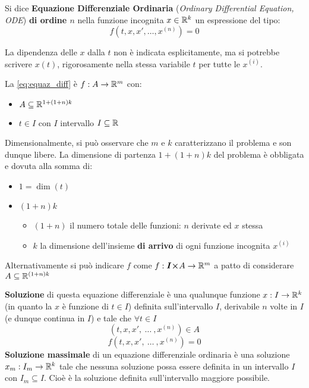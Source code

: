 \begin{definition}
	\label{def:equaz_diff}
	Si dice \textbf{Equazione Differenziale Ordinaria} (\textit{Ordinary Differential Equation, ODE}) \textbf{di ordine $n$} nella funzione incognita $x\in \mathbb{R}^k$ un espressione del tipo:
	\begin{equation}
		\label{eq:equaz_diff}
		f(t,x, x',\ldots,x^{(n)})=0
	\end{equation}
	\vspace*{-\baselineskip}
	\begin{note}
		La dipendenza delle $x$ dalla $t$ non è indicata esplicitamente, ma si potrebbe scrivere $x(t)$, rigorosamente nella stessa variabile $t$ per tutte le $x^{(i)}$.
	\end{note}
	La \cref{eq:equaz_diff} è $f: A \to \mathbb{R}^m$ con:
	\begin{itemize}[noitemsep]
		\item $A\subseteq \mathbb{R}^{1+(1+n)k}$
		\item $t\in I$ con $I$ intervallo $I \subseteq \mathbb{R}$
	\end{itemize}
	Dimensionalmente, si può osservare che $m$ e $k$ caratterizzano il problema e son dunque libere. La dimensione di partenza $1+(1+n)k$ del problema è obbligata e dovuta alla somma di:
	\begin{itemize}[noitemsep]
		\item $1 = \dim(t)$
		\item $(1+n)k$
		\begin{itemize}[noitemsep]
			\item $(1+n)$ il numero totale delle funzioni: $n$ derivate ed $x$ stessa
			\item $k$ la dimensione dell'insieme \textbf{di arrivo} di ogni funzione incognita $x^{(i)}$
		\end{itemize}
	\end{itemize}
	\begin{note}
		Alternativamente si può indicare $f$ come $f: \boldsymbol{I \times} A \to \mathbb{R}^m$ a patto di considerare $A\subseteq \mathbb{R}^{(1+n)k}$
	\end{note}
	\textbf{Soluzione} di questa equazione differenziale è una qualunque funzione $x:I\to \mathbb{R}^k$ (in quanto la $x$ è funzione di $t \in I$) definita sull'intervallo $I$, derivabile $n$ volte in $I$ (e dunque continua in $I$) e tale che $\forall t\in I$
	\[(t,x, x',\:\dotsc\:,x^{(n)}) \in A\]
	\[f(t,x, x',\:\dotsc\:,x^{(n)})=0\]
	\textbf{Soluzione massimale} di un equazione differenziale ordinaria è una soluzione $x_m:I_m\to \mathbb{R}^k$ tale che nessuna soluzione possa essere definita in un intervallo $I$ con $I_m\subseteq I$. Cioè è la soluzione definita sull'intervallo maggiore possibile.


\end{definition}
